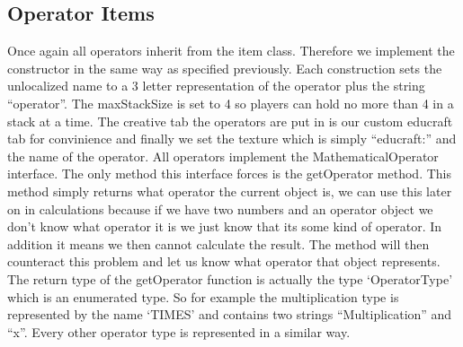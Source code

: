 \subsection{Operator Items}
Once again all operators inherit from the item class. Therefore we implement the constructor in the same way as specified previously. Each construction sets the unlocalized name to a 3 letter representation of the operator plus the string “operator”. The maxStackSize is set to 4 so players can hold no more than 4 in a stack at a time. The creative tab the operators are put in is our custom educraft tab for convinience and finally we set the texture which is simply “educraft:” and the name of the operator. All operators implement the MathematicalOperator interface. The only method this interface forces is the getOperator method. This method simply returns what operator the current object is, we can use this later on in calculations because if we have two numbers and an operator object we don’t know what operator it is we just know that its some kind of operator. In addition it means we then cannot calculate the result. The method will then counteract this problem and let us know what operator that object represents. The return type of the getOperator function is actually the type ‘OperatorType’ which is an enumerated type. So for example the multiplication type is represented by the name ‘TIMES’ and contains two strings “Multiplication” and “x”. Every other operator type is represented in a similar way.

